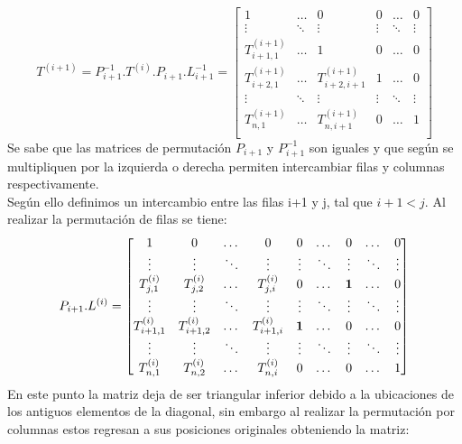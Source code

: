\[T^{(i+1)}=P_{i+1}^{-1}.T^{(i)}.P_{i+1}.L_{i+1}^{-1}=
\begin{bmatrix}
    1  & \dots & 0 & 0 & \dots & 0 \\
   \vdots  & \ddots & \vdots & \vdots & \ddots & \vdots \\
     T_{i+1,1}^{(i+1)} & \dots & 1 & 0 & \dots & 0 \\
    T_{i+2,1}^{(i+1)} & \dots &  T_{i+2,i+1}^{(i+1)} & 1 & \dots & 0 \\
   \vdots  & \ddots & \vdots & \vdots & \ddots & \vdots \\
    T_{n,1}^{(i+1)} & \dots &  T_{n,i+1}^{(i+1)} & 0 & \dots & 1 \\
\end{bmatrix}
\]
Se sabe que las matrices de permutación $P_{i+1}$ y $P_{i+1}^{-1}$ son iguales y que según se multipliquen por la izquierda o derecha permiten intercambiar filas y columnas respectivamente.\\
Según ello definimos un intercambio entre las filas i+1 y j, tal que $i+1< j$. Al realizar la permutación de filas se tiene:\\
\[P_{i+1}.L^{(i)}=
\begin{bmatrix}
    1 &  0 & \dots & 0 & 0 & \dots &  0 & \dots & 0 \\
   \vdots  & \vdots & \ddots & \vdots & \vdots & \ddots & \vdots & \ddots & \vdots \\
   T_{j,1}^{(i)} &  T_{j,2}^{(i)} & \dots &  T_{j,i}^{(i)} & 0 & \dots  & {\bf 1} & \dots & 0 \\
   \vdots  & \vdots & \ddots & \vdots & \vdots & \ddots & \vdots & \ddots & \vdots \\
    T_{i+1,1}^{(i)} &  T_{i+1,2}^{(i)} & \dots &  T_{i+1,i}^{(i)} & {\bf 1} & \dots  & 0 & \dots & 0 \\
   \vdots  & \vdots & \ddots & \vdots & \vdots & \ddots & \vdots & \ddots & \vdots \\
    T_{n,1}^{(i)} &  T_{n,2}^{(i)} & \dots &  T_{n,i}^{(i)} & 0 & \dots & 0 & \dots & 1 \\
\end{bmatrix}
\]
En este punto la matriz deja de ser triangular inferior debido a la ubicaciones de los antiguos elementos de la diagonal, sin embargo al realizar la permutación por columnas estos regresan a sus posiciones originales obteniendo la matriz:\\

